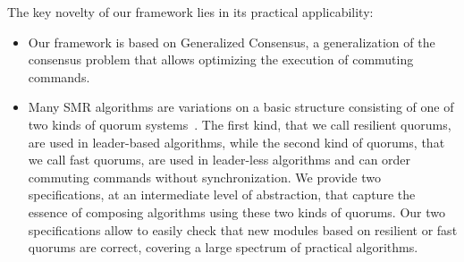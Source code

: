 The key novelty of our framework lies in its practical applicability:
\begin{itemize}
  \item Our framework is based on Generalized Consensus, a generalization of the consensus problem 
    that allows optimizing the execution of commuting commands.
  \item Many SMR algorithms are variations on a basic structure consisting of one of two kinds of 
    quorum systems~\cite{GuerraouiVukolic10RefinedQuorumSystems}. 
    The first kind, that we call resilient quorums, are used in leader-based algorithms, while the second
    kind of quorums, that we call fast quorums, are used in leader-less algorithms and can order commuting commands without synchronization.
    We provide two specifications, at an intermediate level of abstraction, that capture the essence of composing algorithms using these two kinds of quorums.
    Our two specifications allow to easily check that new modules based on resilient or fast quorums are correct, covering a large spectrum of practical algorithms. 
\end{itemize}

